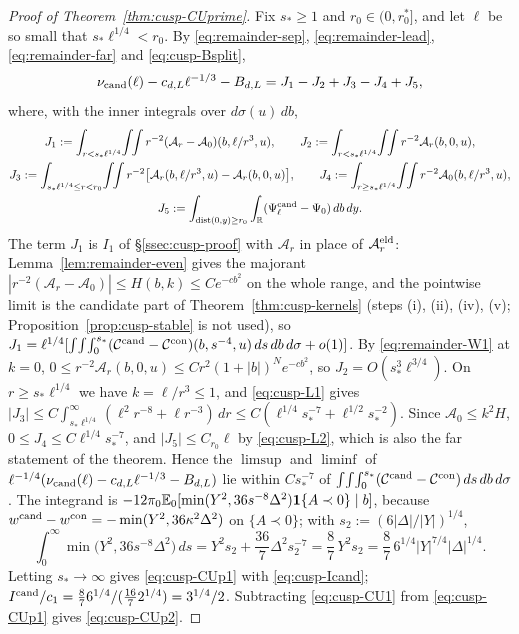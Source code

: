 \begin{proof}[Proof of Theorem~\ref{thm:cusp-CUprime}]
Fix $s_*\ge1$ and $r_0\in(0,r_0^*]$, and let $\ell$ be so small that $s_*\ell^{1/4}<r_0$. By \eqref{eq:remainder-sep}, \eqref{eq:remainder-lead}, \eqref{eq:remainder-far} and \eqref{eq:cusp-Bsplit},
\[
\nu_{\mathrm{cand}}(\ell)-c_{d,L}\ell^{-1/3}-B_{d,L}=J_1-J_2+J_3-J_4+J_5,
\]
where, with the inner integrals over $d\sigma(u)\,db$,
\[
\begin{gathered}
J_1:=\int_{r<s_*\ell^{1/4}}\!\int\!\!\int r^{-2}(\mathcal A_r-\mathcal A_0)(b,\ell/r^3,u),\qquad J_2:=\int_{r<s_*\ell^{1/4}}\!\int\!\!\int r^{-2}\mathcal A_r(b,0,u),\\
J_3:=\int_{s_*\ell^{1/4}\le r<r_0}\!\int\!\!\int r^{-2}\bigl[\mathcal A_r(b,\ell/r^3,u)-\mathcal A_r(b,0,u)\bigr],\qquad J_4:=\int_{r\ge s_*\ell^{1/4}}\!\int\!\!\int r^{-2}\mathcal A_0(b,\ell/r^3,u),\\
J_5:=\int_{\dist(0,y)\ge r_0}\int_\R(\Psi^{\cand}_\ell-\Psi_0)\,db\,dy .
\end{gathered}
\]
The term $J_1$ is $I_1$ of \S\ref{ssec:cusp-proof} with $\mathcal A_r$ in place of $\mathcal A^{\mathrm{eld}}_r$: Lemma~\ref{lem:remainder-even} gives the majorant $|r^{-2}(\mathcal A_r-\mathcal A_0)|\le H(b,k)\le Ce^{-cb^2}$ on the whole range, and the pointwise limit is the candidate part of Theorem~\ref{thm:cusp-kernels} (steps (i), (ii), (iv), (v); Proposition~\ref{prop:cusp-stable} is not used), so $J_1=\ell^{1/4}[\int\!\int\!\int_0^{s_*}(\mathcal C^{\mathrm{cand}}-\mathcal C^{\mathrm{con}})(b,s^{-4},u)\,ds\,db\,d\sigma+o(1)]$.
By \eqref{eq:remainder-W1} at $k=0$, $0\le r^{-2}\mathcal A_r(b,0,u)\le Cr^2(1+|b|)^Ne^{-cb^2}$, so $J_2=O(s_*^3\ell^{3/4})$.
On $r\ge s_*\ell^{1/4}$ we have $k=\ell/r^3\le1$, and \eqref{eq:cusp-L1} gives $|J_3|\le C\int_{s_*\ell^{1/4}}^\infty(\ell^2r^{-8}+\ell r^{-3})\,dr\le C(\ell^{1/4}s_*^{-7}+\ell^{1/2}s_*^{-2})$.
Since $\mathcal A_0\le k^2H$, $0\le J_4\le C\ell^{1/4}s_*^{-7}$, and $|J_5|\le C_{r_0}\ell$ by \eqref{eq:cusp-L2}, which is also the far statement of the theorem.
Hence the $\limsup$ and $\liminf$ of $\ell^{-1/4}(\nu_{\mathrm{cand}}(\ell)-c_{d,L}\ell^{-1/3}-B_{d,L})$ lie within $Cs_*^{-7}$ of $\int\!\int\!\int_0^{s_*}(\mathcal C^{\mathrm{cand}}-\mathcal C^{\mathrm{con}})\,ds\,db\,d\sigma$. The integrand is $-12\pi_0\mathbb E_0[\min(Y^2,36s^{-8}\Delta^2)\mathbf 1\{A\prec0\}\mid b]$, because $w^{\mathrm{cand}}-w^{\mathrm{con}}=-\min(Y^2,36\kappa^2\Delta^2)$ on $\{A\prec0\}$; with $s_2:=(6|\Delta|/|Y|)^{1/4}$,
\begin{equation}\label{eq:cusp-mininteg}
\int_0^\infty\min\bigl(Y^2,36s^{-8}\Delta^2\bigr)\,ds=Y^2s_2+\frac{36}7\Delta^2s_2^{-7}=\frac87\,Y^2s_2=\frac87\,6^{1/4}|Y|^{7/4}|\Delta|^{1/4}.
\end{equation}
Letting $s_*\to\infty$ gives \eqref{eq:cusp-CUp1} with \eqref{eq:cusp-Icand}; $I^{\mathrm{cand}}/c_1=\frac87 6^{1/4}/(\frac{16}7 2^{1/4})=3^{1/4}/2$. Subtracting \eqref{eq:cusp-CU1} from \eqref{eq:cusp-CUp1} gives \eqref{eq:cusp-CUp2}.
\end{proof}

